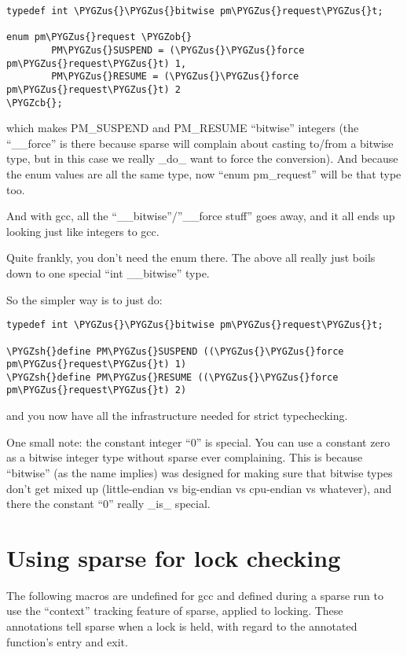 \documentclass[a4paper,8pt,english]{sphinxmanual}
\def\PYGZus{\char`\_}
\def\PYGZob{\char`\{}
\def\PYGZcb{\char`\}}
\def\PYGZsh{\char`\#}
\begin{document}
\begin{Verbatim}[commandchars=\\\{\}]
typedef int \PYGZus{}\PYGZus{}bitwise pm\PYGZus{}request\PYGZus{}t;

enum pm\PYGZus{}request \PYGZob{}
        PM\PYGZus{}SUSPEND = (\PYGZus{}\PYGZus{}force pm\PYGZus{}request\PYGZus{}t) 1,
        PM\PYGZus{}RESUME = (\PYGZus{}\PYGZus{}force pm\PYGZus{}request\PYGZus{}t) 2
\PYGZcb{};
\end{Verbatim}

which makes PM\_SUSPEND and PM\_RESUME ``bitwise'' integers (the ``\_\_force'' is
there because sparse will complain about casting to/from a bitwise type,
but in this case we really \_do\_ want to force the conversion). And because
the enum values are all the same type, now ``enum pm\_request'' will be that
type too.

And with gcc, all the ``\_\_bitwise''/''\_\_force stuff'' goes away, and it all
ends up looking just like integers to gcc.

Quite frankly, you don't need the enum there. The above all really just
boils down to one special ``int \_\_bitwise'' type.

So the simpler way is to just do:

\begin{Verbatim}[commandchars=\\\{\}]
typedef int \PYGZus{}\PYGZus{}bitwise pm\PYGZus{}request\PYGZus{}t;

\PYGZsh{}define PM\PYGZus{}SUSPEND ((\PYGZus{}\PYGZus{}force pm\PYGZus{}request\PYGZus{}t) 1)
\PYGZsh{}define PM\PYGZus{}RESUME ((\PYGZus{}\PYGZus{}force pm\PYGZus{}request\PYGZus{}t) 2)
\end{Verbatim}

and you now have all the infrastructure needed for strict typechecking.

One small note: the constant integer ``0'' is special. You can use a
constant zero as a bitwise integer type without sparse ever complaining.
This is because ``bitwise'' (as the name implies) was designed for making
sure that bitwise types don't get mixed up (little-endian vs big-endian
vs cpu-endian vs whatever), and there the constant ``0'' really \_is\_
special.


\section{Using sparse for lock checking}
\label{dev-tools/sparse:using-sparse-for-lock-checking}
The following macros are undefined for gcc and defined during a sparse
run to use the ``context'' tracking feature of sparse, applied to
locking.  These annotations tell sparse when a lock is held, with
regard to the annotated function's entry and exit.
\end{document}

